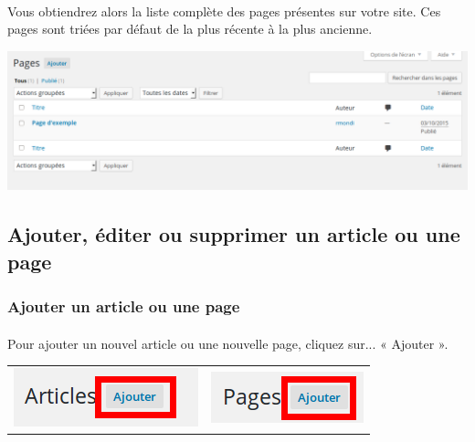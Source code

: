 \documentclass[10pt,a4paper]{article}
\begin{document}
\paragraph{}Vous obtiendrez alors la liste complète des pages présentes sur votre site. Ces pages sont triées par défaut de la plus récente à la plus ancienne.
\begin{center}
\includegraphics[scale=0.3]{img/0062.png}
\end{center}
\subsection{Ajouter, éditer ou supprimer un article ou une page}
\subsubsection{Ajouter un article ou une page}
\paragraph{}Pour ajouter un nouvel article ou une nouvelle page, cliquez sur... « Ajouter ».
\begin{center}
\begin{tabular}{cc}
\includegraphics[scale=0.35]{img/0063.png} &
\includegraphics[scale=0.4]{img/0065.png} \\
\end{tabular}
\end{center}
\end{document}
